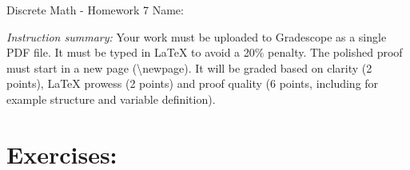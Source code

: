\documentclass[12pt]{article}
\begin{document}
\begin{center}
	{\LARGE Discrete Math - Homework 7} \Large \newline
    Name:
\end{center}

\emph{Instruction summary:} Your work must be uploaded to Gradescope as a single PDF file. It must be typed in LaTeX to avoid a 20\% penalty. The polished proof must start in a new page (\textbackslash{newpage}). It will be graded based on clarity (2 points), LaTeX prowess (2 points) and proof quality (6 points, including for example structure and variable definition).

\section*{Exercises:}
\end{document}
